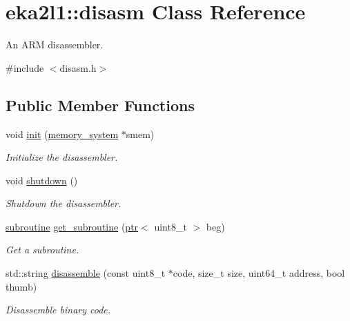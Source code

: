 \hypertarget{classeka2l1_1_1disasm}{}\section{eka2l1\+:\+:disasm Class Reference}
\label{classeka2l1_1_1disasm}


An A\+RM disassembler.  




{\ttfamily \#include $<$disasm.\+h$>$}

\subsection*{Public Member Functions}
\begin{DoxyCompactItemize}
\item 
void \mbox{\hyperlink{classeka2l1_1_1disasm_a0911b390a5f620597b6a2c4ed6ca0a2f}{init}} (\mbox{\hyperlink{classeka2l1_1_1memory__system}{memory\+\_\+system}} $\ast$smem)
\begin{DoxyCompactList}\small\item\em Initialize the disassembler. \end{DoxyCompactList}\item 
\mbox{\label{classeka2l1_1_1disasm_a60f3b06876f186ac994372f0afe693b6}} 
void \mbox{\hyperlink{classeka2l1_1_1disasm_a60f3b06876f186ac994372f0afe693b6}{shutdown}} ()
\begin{DoxyCompactList}\small\item\em Shutdown the disassembler. \end{DoxyCompactList}\item 
\mbox{\hyperlink{structeka2l1_1_1subroutine}{subroutine}} \mbox{\hyperlink{classeka2l1_1_1disasm_ab845c7a9933b477e94bc4be29498c0a1}{get\+\_\+subroutine}} (\mbox{\hyperlink{classeka2l1_1_1ptr}{ptr}}$<$ uint8\+\_\+t $>$ beg)
\begin{DoxyCompactList}\small\item\em Get a subroutine. \end{DoxyCompactList}\item 
std\+::string \mbox{\hyperlink{classeka2l1_1_1disasm_a7c2a3e456387d014cf38ab05db5340b0}{disassemble}} (const uint8\+\_\+t $\ast$code, size\+\_\+t size, uint64\+\_\+t address, bool thumb)
\begin{DoxyCompactList}\small\item\em Disassemble binary code. \end{DoxyCompactList}\end{DoxyCompactItemize}


